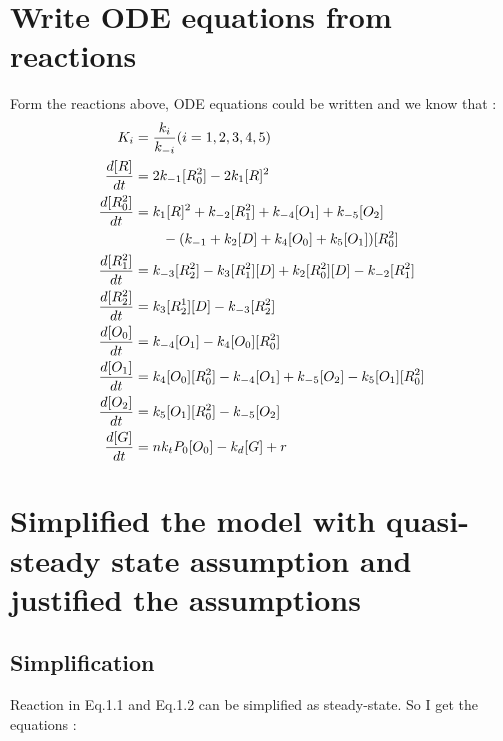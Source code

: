 \section{Write ODE equations from reactions}

Form the reactions above, ODE equations could be written and we know that : 
\begin{equation} 
\begin{aligned} 
\centering
K_i &= \frac{k_i}{k_{-i}}(i = 1,2,3,4,5) \\
\frac{d[R]}{dt} &= 2k_{-1}[R_0^2] - 2k_1 [R]^2  \\
\frac{d[R_0^2]}{dt} &= k_1 [R]^2 + k_{-2} [R^2_1] + k_{-4}[O_1] + k_{-5}[O_2] \\
				&\qquad - (k_{-1}+k_2[D]+k_4[O_0]+k_5[O_1]) [R_0^2] \\
\frac{d[R_1^2]}{dt} &= k_{-3}[R_2^2]-k_3[R^2_1][D]+k_2[R^2_0][D]-k_{-2}[R^2_1] \\
\frac{d[R_2^2]}{dt} &= k_{3}[R_2^1][D]- k_{-3}[R^2_2] \\
\frac{d[O_0]}{dt} &= k_{-4}[O_1]-k_4[O_0][R_0^2] \\
\frac{d[O_1]}{dt} &= k_4[O_0][R_0^2]-k_{-4}[O_1]+k_{-5}[O_2]-k_5[O_1][R_0^2] \\
\frac{d[O_2]}{dt} &= k_5[O_1][R_0^2]-k_{-5}[O_2] \\
\frac{d[G]}{dt} &= n k_t P_0 [O_0] - k_d[G] + r \\
\end{aligned} 
\end{equation}
 


\newpage
\section{Simplified the model with quasi-steady state assumption and justified the assumptions}

\subsection{Simplification}
Reaction in Eq.1.1 and Eq.1.2 can be simplified as steady-state.
So I get the equations :

